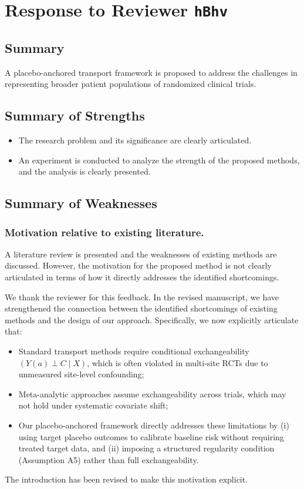 \section{Response to Reviewer \texttt{hBhv}}

\subsection*{Summary}

A placebo-anchored transport framework is proposed to address the challenges in representing broader patient populations of randomized clinical trials.


\subsection*{Summary of Strengths}

\begin{itemize}
    \item The research problem and its significance are clearly articulated.
    \item An experiment is conducted to analyze the strength of the proposed methods, and the analysis is clearly presented.
\end{itemize}


\subsection*{Summary of Weaknesses}


\subsubsection{Motivation relative to existing literature.}  
A literature review is presented and the weaknesses of existing methods are discussed. However, the motivation for the proposed method is not clearly articulated in terms of how it directly addresses the identified shortcomings.

{\color{blue}
We thank the reviewer for this feedback. In the revised manuscript, we have strengthened the connection between the identified shortcomings of existing methods and the design of our approach. Specifically, we now explicitly articulate that:
\begin{itemize}
\item Standard transport methods require conditional exchangeability $(Y(a) \perp C \mid X)$, which is often violated in multi-site RCTs due to unmeasured site-level confounding;
\item Meta-analytic approaches assume exchangeability across trials, which may not hold under systematic covariate shift;
\item Our placebo-anchored framework directly addresses these limitations by (i) using target placebo outcomes to calibrate baseline risk without requiring treated target data, and (ii) imposing a structured regularity condition (Assumption A5) rather than full exchangeability.
\end{itemize}
The introduction has been revised to make this motivation explicit.
}

